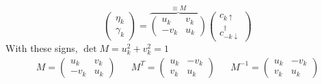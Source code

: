 \begin{equation}
\begin{pmatrix}
\eta_k \\ \gamma_k
\end{pmatrix}
 = 
 \overbrace{\begin{pmatrix}
 u_k & v_k \\ -v_k & u_k
 \end{pmatrix}}^{\equiv M}
 \begin{pmatrix}
c_{k\uparrow} \\ c_{-k\downarrow}^\dagger
 \end{pmatrix}
\end{equation}
With these signs, $\det M = u_k^2 + v_k^2 = 1$
\begin{align}
M =	\begin{pmatrix}
	u_k & v_k \\ -v_k & u_k
	\end{pmatrix}
	&&
M^T=	\begin{pmatrix}
	u_k & -v_k \\ v_k & u_k
	\end{pmatrix}
	&&
M^{-1}=	\begin{pmatrix}
	u_k & -v_k \\ v_k & u_k
	\end{pmatrix}
\end{align}

